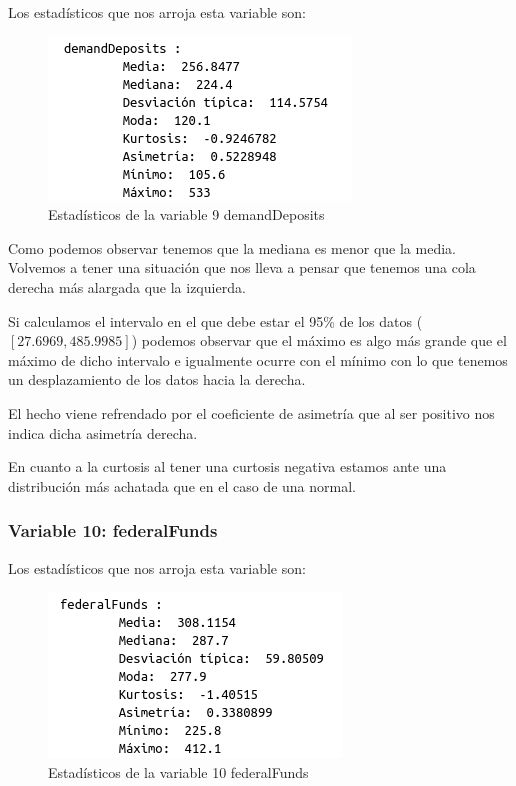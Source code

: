 \documentclass[12pt,a4paper]{article}
\begin{document}
Los estadísticos que nos arroja esta variable son:

\begin{figure}[H]
	\centering
	\includegraphics[scale=0.7]{./Imagenes/estadisticos_demandDeposits.png}
	\caption{Estadísticos de la variable 9 demandDeposits}
\end{figure}

Como podemos observar tenemos que la mediana es menor que la media. Volvemos a tener una situación que nos lleva a pensar que tenemos una cola derecha más alargada que la izquierda.

Si calculamos el intervalo en el que debe estar el 95\% de los datos ($[27.6969,485.9985]$) podemos observar que el máximo es algo más grande que el máximo de dicho intervalo e igualmente ocurre con el mínimo con lo que tenemos un desplazamiento de los datos hacia la derecha.

El hecho viene refrendado por el coeficiente de asimetría que al ser positivo nos indica dicha asimetría derecha.

En cuanto a la curtosis al tener una curtosis negativa estamos ante una distribución más achatada que en el caso de una normal.

\subsubsection*{Variable 10: federalFunds}

Los estadísticos que nos arroja esta variable son:

\begin{figure}[H]
	\centering
	\includegraphics[scale=0.7]{./Imagenes/estadisticos_federalFunds.png}
	\caption{Estadísticos de la variable 10 federalFunds}
\end{figure}
\end{document}
